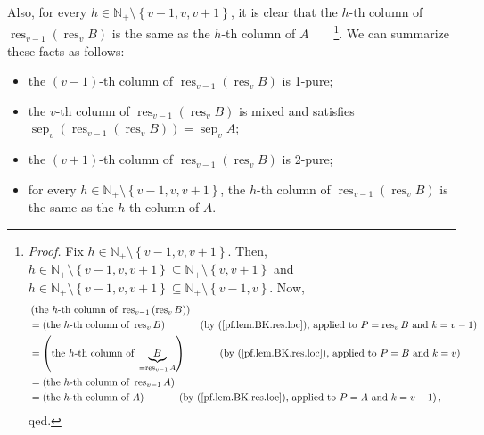 \documentclass[numbers=enddot,12pt,final,onecolumn,notitlepage]{scrartcl}%
\theoremstyle{definition}
\begin{document}
Also, for every $h\in\mathbb{N}_{+}\setminus\left\{  v-1,v,v+1\right\}  $, it
is clear that the $h$-th column of $\operatorname*{res}\nolimits_{v-1}\left(
\operatorname*{res}\nolimits_{v}B\right)  $ is the same as the $h$-th column
of $A$\ \ \ \ \footnote{\textit{Proof.} Fix $h\in\mathbb{N}_{+}\setminus
\left\{  v-1,v,v+1\right\}  $. Then, $h\in\mathbb{N}_{+}\setminus\left\{
v-1,v,v+1\right\}  \subseteq\mathbb{N}_{+}\setminus\left\{  v,v+1\right\}  $
and $h\in\mathbb{N}_{+}\setminus\left\{  v-1,v,v+1\right\}  \subseteq
\mathbb{N}_{+}\setminus\left\{  v-1,v\right\}  $. Now,%
\begin{align*}
&  \left(  \text{the }h\text{-th column of }\operatorname*{res}\nolimits_{v-1}%
\left(  \operatorname*{res}\nolimits_{v}B\right)  \right) \\
&  =\left(  \text{the }h\text{-th column of }\operatorname*{res}%
\nolimits_{v}B\right)  \ \ \ \ \ \ \ \ \ \ \left(  \text{by
(\ref{pf.lem.BK.res.loc}), applied to }P=\operatorname*{res}\nolimits_{v}%
B\text{ and }k=v-1\right) \\
&  =\left(  \text{the }h\text{-th column of }\underbrace{B}%
_{=\operatorname*{res}\nolimits_{v-1}A}\right)  \ \ \ \ \ \ \ \ \ \ \left(
\text{by (\ref{pf.lem.BK.res.loc}), applied to }P=B\text{ and }k=v\right) \\
&  =\left(  \text{the }h\text{-th column of }\operatorname*{res}%
\nolimits_{v-1}A\right) \\
&  =\left(  \text{the }h\text{-th column of }A\right)
\ \ \ \ \ \ \ \ \ \ \left(  \text{by (\ref{pf.lem.BK.res.loc}), applied to
}P=A\text{ and }k=v-1\right)  ,
\end{align*}
qed.}. We can summarize these facts as follows:

\begin{itemize}
\item the $\left(  v-1\right)  $-th column of $\operatorname*{res}%
\nolimits_{v-1}\left(  \operatorname*{res}\nolimits_{v}B\right)  $ is 1-pure;

\item the $v$-th column of $\operatorname*{res}\nolimits_{v-1}\left(
\operatorname*{res}\nolimits_{v}B\right)  $ is mixed and satisfies
$\operatorname*{sep}\nolimits_{v}\left(  \operatorname*{res}\nolimits_{v-1}%
\left(  \operatorname*{res}\nolimits_{v}B\right)  \right)
=\operatorname*{sep}\nolimits_{v}A$;

\item the $\left(  v+1\right)  $-th column of $\operatorname*{res}%
\nolimits_{v-1}\left(  \operatorname*{res}\nolimits_{v}B\right)  $ is 2-pure;

\item for every $h\in\mathbb{N}_{+}\setminus\left\{  v-1,v,v+1\right\}  $, the
$h$-th column of $\operatorname*{res}\nolimits_{v-1}\left(
\operatorname*{res}\nolimits_{v}B\right)  $ is the same as the $h$-th column
of $A$.
\end{itemize}
\end{document}
